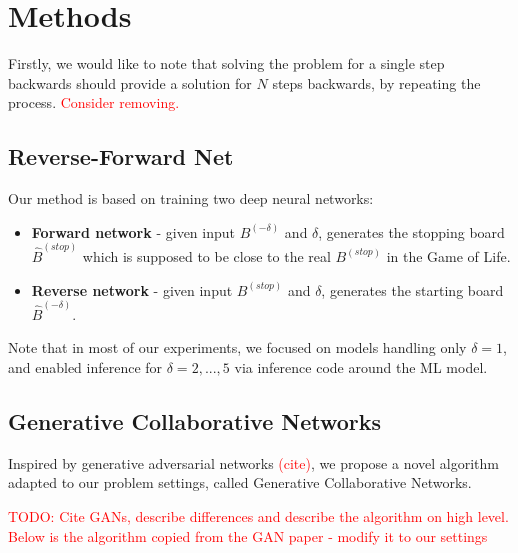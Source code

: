 \documentclass[conference]{IEEEtran}
\newcommand\todo[1]{\textcolor{red}{#1}}
\begin{document}

\section{Methods}

Firstly, we would like to note that solving the problem for a single step backwards should provide a solution for $N$ steps backwards, by repeating the process. \todo{Consider removing.}


\subsection{Reverse-Forward Net}

Our method is based on training two deep neural networks:
\begin{itemize}
    \item \textbf{Forward network} - given input $B^{(-\delta)}$ and $\delta$, generates the stopping board $\hat B^{(stop)}$ which is supposed to be close to the real $B^{(stop)}$ in the Game of Life.
    \item \textbf{Reverse network} - given input $B^{(stop)}$ and $\delta$, generates the starting board $\hat B^{(-\delta)}$.
\end{itemize}

Note that in most of our experiments, we focused on models handling only $\delta = 1$, and enabled inference for $\delta = {2,...,5}$ via inference code around the ML model.

\subsection{Generative Collaborative Networks}

Inspired by generative adversarial networks \todo{(cite)}, we propose a novel algorithm adapted to our problem settings, called Generative Collaborative Networks.


\todo{TODO: Cite GANs, describe differences and describe the algorithm on high level. Below is the algorithm copied from the GAN paper - modify it to our settings}
\end{document}
